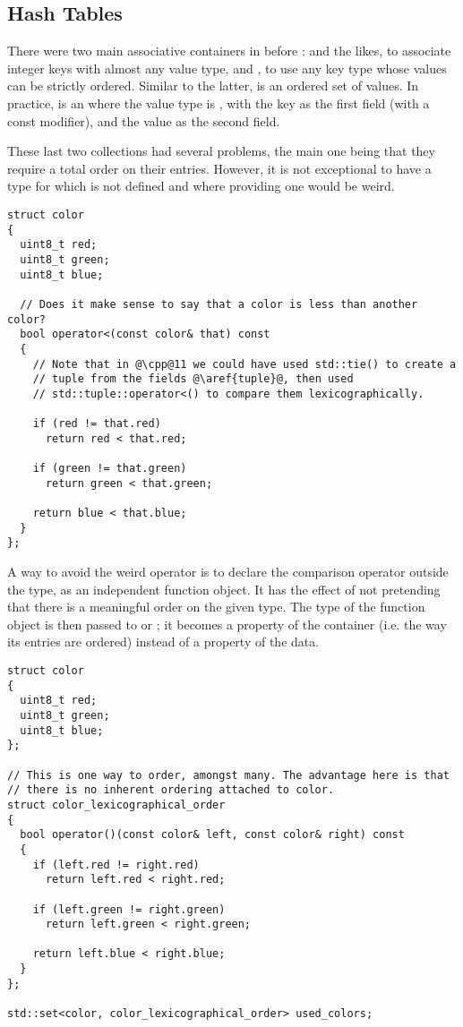 \subsection{Hash Tables}

There were two main associative containers in \cpp{} before :
 and the likes, to associate integer keys with
almost any value type, and , to use any key type whose
values can be strictly ordered. Similar to the latter, 
is an ordered set of values. In practice,  is an
 where the value type is , with the key
as the first field (with a const modifier), and the value as the
second field.

These last two collections had several problems, the main one being
that they require a total order on their entries. However, it is not
exceptional to have a type for which  is not defined
and where providing one would be weird.

\begin{lstlisting}
struct color
{
  uint8_t red;
  uint8_t green;
  uint8_t blue;

  // Does it make sense to say that a color is less than another color?
  bool operator<(const color& that) const
  {
    // Note that in @\cpp@11 we could have used std::tie() to create a
    // tuple from the fields @\aref{tuple}@, then used
    // std::tuple::operator<() to compare them lexicographically.

    if (red != that.red)
      return red < that.red;

    if (green != that.green)
      return green < that.green;

    return blue < that.blue;
  }
};
\end{lstlisting}

A way to avoid the weird operator is to declare the comparison
operator outside the type, as an independent function object. It has
the effect of not pretending that there is a meaningful order on the
given type. The type of the function object is then passed to
 or ; it becomes a property of the
container (i.e. the way its entries are ordered) instead of a property
of the data.

\begin{lstlisting}
struct color
{
  uint8_t red;
  uint8_t green;
  uint8_t blue;
};

// This is one way to order, amongst many. The advantage here is that
// there is no inherent ordering attached to color.
struct color_lexicographical_order
{
  bool operator()(const color& left, const color& right) const
  {
    if (left.red != right.red)
      return left.red < right.red;

    if (left.green != right.green)
      return left.green < right.green;

    return left.blue < right.blue;
  }
};

std::set<color, color_lexicographical_order> used_colors;
\end{lstlisting}

